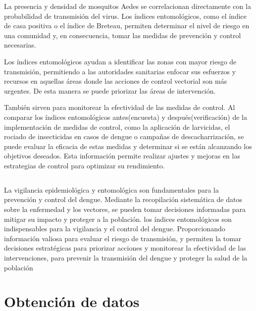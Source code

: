\documentclass[
  letterpaper,
]{scrbook}
\begin{document}
La presencia y densidad de mosquitos Aedes se correlacionan directamente
con la probabilidad de transmisión del virus. Los índices entomológicos,
como el índice de casa positiva o el índice de Breteau, permiten
determinar el nivel de riesgo en una comunidad y, en consecuencia, tomar
las medidas de prevención y control necesarias.

Los índices entomológicos ayudan a identificar las zonas con mayor
riesgo de transmisión, permitiendo a las autoridades sanitarias enfocar
sus esfuerzos y recursos en aquellas áreas donde las acciones de control
vectorial son más urgentes. De esta manera se puede priorizar las áreas
de intervención.

También sirven para monitorear la efectividad de las medidas de control.
Al comparar los índices entomológicos antes(encuesta) y
después(verificación) de la implementación de medidas de control, como
la aplicación de larvicidas, el rociado de insecticidas en casos de
dengue o campañas de descacharrización, se puede evaluar la eficacia de
estas medidas y determinar si se están alcanzando los objetivos
deseados. Esta información permite realizar ajustes y mejoras en las
estrategias de control para optimizar su rendimiento.

\subsection{}\label{section}

La vigilancia epidemiológica y entomológica son fundamentales para la
prevención y control del dengue. Mediante la recopilación sistemática de
datos sobre la enfermedad y los vectores, se pueden tomar decisiones
informadas para mitigar su impacto y proteger a la población. los
índices entomológicos son indispensables para la vigilancia y el control
del dengue. Proporcionando información valiosa para evaluar el riesgo de
transmisión, y permiten la tomar decisiones estratégicas para priorizar
acciones y monitorear la efectividad de las intervenciones, para
prevenir la transmisión del dengue y proteger la salud de la población

\section{Obtención de datos}\label{obtenciuxf3n-de-datos}
\end{document}

